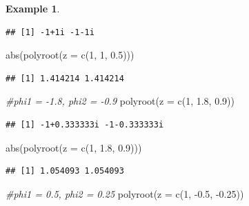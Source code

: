 \documentclass[
]{book}
\newenvironment{Shaded}{\begin{snugshade}}{\end{snugshade}}
\newcommand{\AttributeTok}[1]{\textcolor[rgb]{0.77,0.63,0.00}{#1}}
\newcommand{\CommentTok}[1]{\textcolor[rgb]{0.56,0.35,0.01}{\textit{#1}}}
\newcommand{\DecValTok}[1]{\textcolor[rgb]{0.00,0.00,0.81}{#1}}
\newcommand{\FloatTok}[1]{\textcolor[rgb]{0.00,0.00,0.81}{#1}}
\newcommand{\FunctionTok}[1]{\textcolor[rgb]{0.00,0.00,0.00}{#1}}
\newcommand{\NormalTok}[1]{#1}
\newcommand{\SpecialCharTok}[1]{\textcolor[rgb]{0.00,0.00,0.00}{#1}}
\theoremstyle{definition}
\theoremstyle{definition}
\newtheorem{example}{Example}[chapter]
\theoremstyle{definition}
\theoremstyle{definition}
\theoremstyle{remark}
\begin{document}
\begin{example}
\begin{verbatim}
## [1] -1+1i -1-1i
\end{verbatim}

\begin{Shaded}
\begin{Highlighting}[]
\FunctionTok{abs}\NormalTok{(}\FunctionTok{polyroot}\NormalTok{(}\AttributeTok{z =} \FunctionTok{c}\NormalTok{(}\DecValTok{1}\NormalTok{, }\DecValTok{1}\NormalTok{, }\FloatTok{0.5}\NormalTok{))) }
\end{Highlighting}
\end{Shaded}

\begin{verbatim}
## [1] 1.414214 1.414214
\end{verbatim}

\begin{Shaded}
\begin{Highlighting}[]
\CommentTok{\#phi1 = {-}1.8, phi2 = {-}0.9}
\FunctionTok{polyroot}\NormalTok{(}\AttributeTok{z =} \FunctionTok{c}\NormalTok{(}\DecValTok{1}\NormalTok{, }\FloatTok{1.8}\NormalTok{, }\FloatTok{0.9}\NormalTok{))  }
\end{Highlighting}
\end{Shaded}

\begin{verbatim}
## [1] -1+0.333333i -1-0.333333i
\end{verbatim}

\begin{Shaded}
\begin{Highlighting}[]
\FunctionTok{abs}\NormalTok{(}\FunctionTok{polyroot}\NormalTok{(}\AttributeTok{z =} \FunctionTok{c}\NormalTok{(}\DecValTok{1}\NormalTok{, }\FloatTok{1.8}\NormalTok{, }\FloatTok{0.9}\NormalTok{))) }
\end{Highlighting}
\end{Shaded}

\begin{verbatim}
## [1] 1.054093 1.054093
\end{verbatim}

\begin{Shaded}
\begin{Highlighting}[]
\CommentTok{\#phi1 = 0.5, phi2 = 0.25 }
\FunctionTok{polyroot}\NormalTok{(}\AttributeTok{z =} \FunctionTok{c}\NormalTok{(}\DecValTok{1}\NormalTok{, }\SpecialCharTok{{-}}\FloatTok{0.5}\NormalTok{, }\SpecialCharTok{{-}}\FloatTok{0.25}\NormalTok{))}
\end{Highlighting}
\end{Shaded}


\end{example}
\end{document}
